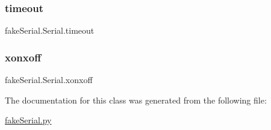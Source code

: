 \subsubsection{\texorpdfstring{timeout}{timeout}}
{\footnotesize\ttfamily fake\+Serial.\+Serial.\+timeout}

\mbox{\label{classfake_serial_1_1_serial_a66d563b6efbcddbe5b6b295f5446a268}} 
\subsubsection{\texorpdfstring{xonxoff}{xonxoff}}
{\footnotesize\ttfamily fake\+Serial.\+Serial.\+xonxoff}



The documentation for this class was generated from the following file\+:\begin{DoxyCompactItemize}
\item 
\mbox{\hyperlink{fake_serial_8py}{fake\+Serial.\+py}}\end{DoxyCompactItemize}
